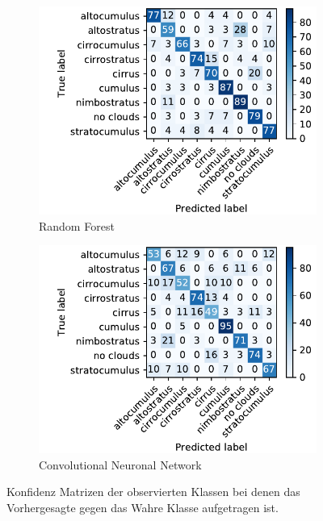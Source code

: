 \begin{figure}[h]
		\centering
		\begin{subfigure}[b]{0.49\textwidth}
				\begin{center}
						\includegraphics[width=\textwidth]{./pictures/conf_rf.pdf}
				\end{center}
		\vspace{-0.6cm}
				\caption{Random Forest}
				\label{fig:conf_rf}
		\end{subfigure}
		\begin{subfigure}[b]{0.49\textwidth}
				\begin{center}
						\includegraphics[width=\textwidth]{./pictures/conf_nn.pdf}
				\end{center}
		\vspace{-0.6cm}
				\caption{Convolutional Neuronal Network}
				\label{fig:conf_cnn}
		\end{subfigure}
		\caption{Konfidenz Matrizen der observierten Klassen bei denen das
		Vorhergesagte gegen das Wahre Klasse aufgetragen ist.}
		\label{fig:conf}
\end{figure}
